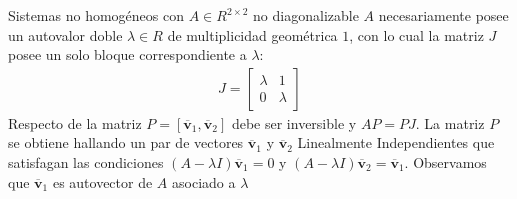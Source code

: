 \documentclass[a4paper, twoside]{article}
\numberwithin{equation}{section}
\numberwithin{figure}{section}
\numberwithin{table}{section}
\newcommand{\vect}[1]{\overline{\textbf{#1}}}
\begin{document}
\begin{corolario}{Sistemas no homogéneos con $A \in R^{2 \times 2}$ no diagonalizable}
  $A$ necesariamente posee un autovalor doble $\lambda \in R$ de multiplicidad geométrica $1$, con lo cual la matriz $J$ posee un solo bloque correspondiente a $\lambda$:
  \begin{align}
    J=\begin{bmatrix} {\lambda}&{1} \\ {0}&{\lambda} \end{bmatrix}
  \end{align}
  Respecto de la matriz $P=[\vect{v}_1,\vect{v}_2]$ debe ser inversible y $AP=PJ$. La matriz $P$ se obtiene hallando un par de vectores $\vect{v}_1$ y $\vect{v}_2$ Linealmente Independientes que satisfagan las condiciones $\left( A-\lambda I \right)\vect{v}_1=0$ y $\left( A-\lambda I \right)\vect{v}_2=\vect{v}_1$. Observamos que $\vect{v}_1$ es autovector de $A$ asociado a $\lambda$
\end{corolario}
\end{document}
